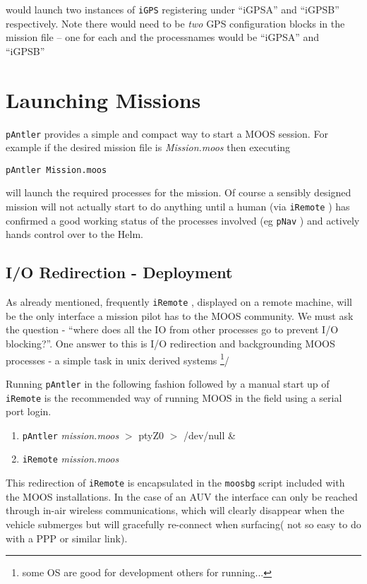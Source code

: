 \documentclass[a4paper,10pt]{article}
\newcommand{\Code}[1]{\texttt{#1} }
\newcommand{\code}[1]{\Code{#1} }
\begin{document}
would launch two instances of \code{iGPS} registering under
``iGPSA'' and ``iGPSB'' respectively. Note there would need to be
\emph{two} GPS configuration blocks in the mission file -- one for
each and the processnames would be ``iGPSA'' and ``iGPSB''


\section{Launching Missions}
\code{pAntler} provides a simple and compact way to start a MOOS
session. For example if the desired mission file is
{\it{Mission.moos}} then executing
\begin{center}
\code{pAntler Mission.moos}
\end{center}
will launch the required processes for the  mission. Of course a
sensibly designed mission will not actually start to do anything
until a human (via \code{iRemote}) has confirmed a good working
status of the processes involved (eg \code{pNav}) and actively
hands control over to the Helm.

\subsection{I/O Redirection - Deployment} As already mentioned,
frequently \code{iRemote}, displayed on a remote machine, will be
the only interface a mission pilot has to the MOOS community.  We
must ask the question -  ``where does all the IO from other
processes go to prevent I/O blocking?''. One answer to this is I/O
redirection and backgrounding MOOS processes - a simple task in
unix derived systems \footnote{some OS are good for development
others for running...}/

Running \code{pAntler} in the following fashion followed by a
manual start up of \code{iRemote} is the recommended way of
running MOOS in the field using a serial port login.

\begin{enumerate}
\item \code{pAntler} {\it{mission.moos}} $>$ ptyZ0 $>$ /dev/null \&
\item \code{iRemote} {\it{mission.moos}}
\end{enumerate}

This redirection of \code{iRemote} is encapsulated in the
\code{moosbg} script included with the MOOS installations. In the
case of an AUV the interface can only be reached  through in-air
wireless communications, which will clearly disappear when the
vehicle submerges but will gracefully re-connect when surfacing(
not so easy to do with a PPP or similar link).
\end{document}
